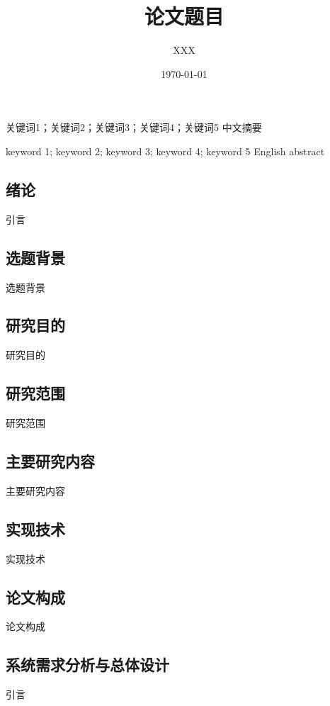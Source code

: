 \documentclass[twoside]{CUGThesis}
\title{论文题目} %
\author{XXX} %
\date{\today} %
\begin{document}
\maketitle
\makestatement

\begin{cnabstract}{关键词1；关键词2；关键词3；关键词4；关键词5}
	中文摘要
\end{cnabstract}

\begin{enabstract}{keyword 1; keyword 2; keyword 3; keyword 4; keyword 5}
   	English abstract
\end{enabstract}

\makeToc
	

\begin{spacing}{2}
	\section{绪论}
\end{spacing}
引言
	\subsection{选题背景}
	选题背景
	\subsection{研究目的}
	研究目的
	\subsection{研究范围}
	研究范围
	\subsection{主要研究内容}
	主要研究内容
	\subsection{实现技术}
	实现技术
	\subsection{论文构成}
	论文构成

\begin{spacing}{2}
	\section{系统需求分析与总体设计}
\end{spacing}
引言
\end{document}

